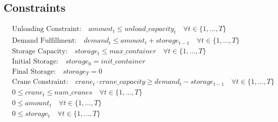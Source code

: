\documentclass{article}
\begin{document}
\subsection*{Constraints}
\begin{align}
    & \text{Unloading Constraint:} \quad amount_t \leq unload\_capacity_t \quad \forall t \in \{1, \ldots, T\} \\
    & \text{Demand Fulfillment:} \quad demand_t \leq amount_t + storage_{t-1} \quad \forall t \in \{1, \ldots, T\} \\
    & \text{Storage Capacity:} \quad storage_t \leq max\_container \quad \forall t \in \{1, \ldots, T\} \\
    & \text{Initial Storage:} \quad storage_0 = init\_container \\
    & \text{Final Storage:} \quad storage_T = 0 \\
    & \text{Crane Constraint:} \quad crane_t \cdot crane\_capacity \geq demand_t - storage_{t-1} \quad \forall t \in \{1, \ldots, T\} \\
    & 0 \leq crane_t \leq num\_cranes \quad \forall t \in \{1, \ldots, T\} \\
    & 0 \leq amount_t \quad \forall t \in \{1, \ldots, T\} \\
    & 0 \leq storage_t \quad \forall t \in \{1, \ldots, T\}
\end{align}
\end{document}
